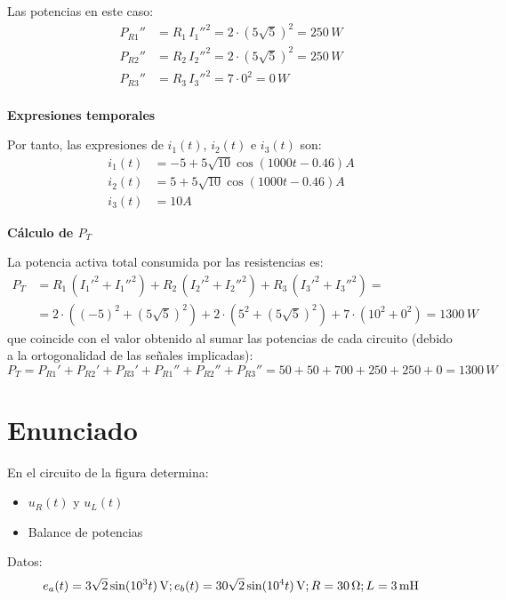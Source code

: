 Las potencias en este caso:
\begin{align*}
  P_{R1}''&=R_1\,I_1''^2=2\cdot (5\sqrt{5})^2=250\,W\\
  P_{R2}''&=R_2\,I_2''^2=2\cdot (5\sqrt{5})^2=250\,W\\
  P_{R3}''&=R_3\,I_3''^2=7\cdot 0^2=0\,W\\
\end{align*}
    
\textbf{Expresiones temporales}
    
Por tanto, las expresiones de $i_1(t)$, $i_2(t)$ e $i_3(t)$ son:
\begin{align*}
  i_1(t)&= -5+5\sqrt{10}\cos(1000t-0.46) A \\
  i_2(t)&= 5+5\sqrt{10}\cos(1000t-0.46) A \\
  i_3(t)&= 10 A 
\end{align*}
    
\textbf{Cálculo de $P_T$}
    
La potencia activa total consumida por las resistencias es:
\begin{align*}
  P_T&=R_1\,(I_1'^2+I_1''^2)+R_2\,(I_2'^2+I_2''^2)+R_3\,(I_3'^2+I_3''^2)=\\
     &=2\cdot((-5)^2+(5\sqrt{5})^2)+2\cdot(5^2+(5\sqrt{5})^2)+7\cdot (10^2+0^2)={1300\,W}
\end{align*}
que coincide con el valor obtenido al sumar las potencias de cada
circuito (debido a la ortogonalidad de las señales implicadas):
\begin{equation*}
  P_T=P_{R1}'+P_{R2}'+P_{R3}'+P_{R1}''+P_{R2}''+P_{R3}''=50+50+700+250+250+0=1300\,W
\end{equation*}


\section{Enunciado}
En el circuito de la figura determina:
\begin{itemize}
\item $u_R(t)$ y $u_L(t)$
\item Balance de potencias
\end{itemize}
Datos:
\begin{equation*}
  e_a(t) = \qty[parse-numbers=false]{3\sqrt{2} \sin(10^3 t)}{\volt}; e_b(t) = \qty[parse-numbers=false]{30\sqrt{2} \sin(10^4 t)}{\volt}; R = \qty{30}{\ohm}; L = \qty{3}{\milli\henry} 
\end{equation*}

